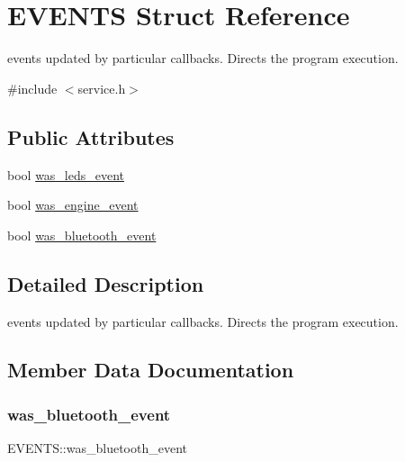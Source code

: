 \hypertarget{struct_e_v_e_n_t_s}{}\section{E\+V\+E\+N\+TS Struct Reference}
\label{struct_e_v_e_n_t_s}


events updated by particular callbacks. Directs the program execution.  




{\ttfamily \#include $<$service.\+h$>$}

\subsection*{Public Attributes}
\begin{DoxyCompactItemize}
\item 
bool \mbox{\hyperlink{struct_e_v_e_n_t_s_a7cbf97b5ba85d6edc3cac909ef10e55c}{was\+\_\+leds\+\_\+event}}
\item 
bool \mbox{\hyperlink{struct_e_v_e_n_t_s_a371d5734376c3dc2b5fb41e8f5cfeb3c}{was\+\_\+engine\+\_\+event}}
\item 
bool \mbox{\hyperlink{struct_e_v_e_n_t_s_a3e62c4f9d468fb6a8df38073dff0a253}{was\+\_\+bluetooth\+\_\+event}}
\end{DoxyCompactItemize}


\subsection{Detailed Description}
events updated by particular callbacks. Directs the program execution. 

\subsection{Member Data Documentation}
\mbox{\label{struct_e_v_e_n_t_s_a3e62c4f9d468fb6a8df38073dff0a253}} 
\subsubsection{\texorpdfstring{was\+\_\+bluetooth\+\_\+event}{was\_bluetooth\_event}}
{\footnotesize\ttfamily E\+V\+E\+N\+T\+S\+::was\+\_\+bluetooth\+\_\+event}


